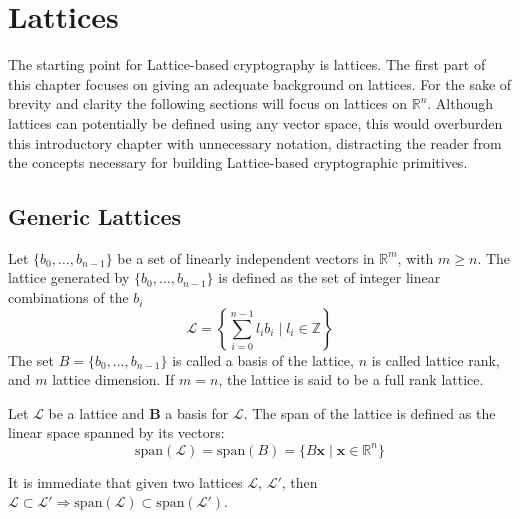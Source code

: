 \section{Lattices}

The starting point for Lattice-based cryptography is lattices. The first part of this chapter focuses on giving an adequate background on lattices. For the sake of brevity and clarity the following sections will focus on lattices on $\mathbb{R}^n$. Although lattices can potentially be defined using any vector space, this would overburden this introductory chapter with unnecessary notation, distracting the reader from the concepts necessary for building Lattice-based cryptographic primitives.

\subsection{Generic Lattices}\label{sec:bg:g_lattice}

\begin{definition}[Lattice]
Let $\{b_0,\ldots,b_{n-1}\}$ be a set of linearly independent vectors in $\mathbb{R}^m$, with $m\geq n$. The lattice generated by $\{b_0,\ldots,b_{n-1}\}$ is defined as the set of integer linear combinations of the $b_i$
\begin{equation*}
\mathscr{L}=\left\{\sum_{i=0}^{n-1}l_ib_i \mid l_i\in\mathbb{Z}\right\}
\end{equation*}
The set $B=\{b_0,\ldots,b_{n-1}\}$ is called a basis of the lattice, $n$ is called lattice rank, and $m$ lattice dimension. If $m=n$, the lattice is said to be a full rank lattice.
\end{definition}

\begin{definition}
Let $\mathscr{L}$ be a lattice and $\mathbf{B}$ a basis for $\mathscr{L}$. The span of the lattice is defined as the linear space spanned by its vectors:
\begin{equation*}
\mathrm{span}(\mathscr{L}) = \mathrm{span}(B) = \{B\mathbf{x}\mid\mathbf{x}\in\mathbb{R}^n\}
\end{equation*} 
\end{definition}

\begin{remark}
It is immediate that given two lattices $\mathscr{L}$, $\mathscr{L}'$, then $\mathscr{L}\subset \mathscr{L}' \Rightarrow \mathrm{span}(\mathscr{L}) \subset \mathrm{span}(\mathscr{L}')$.
\end{remark}

